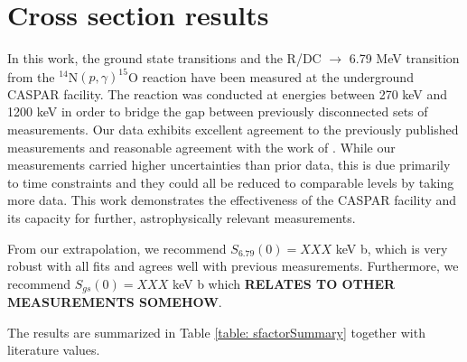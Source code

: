\section{Cross section results}
\label{sec: csResults}

In this work, the ground state transitions and the R/DC $\rightarrow$ 6.79 MeV transition from the $^{14}$N$(p,\gamma)^{15}$O reaction have been measured at the underground CASPAR facility. The reaction was conducted at energies between 270 keV and 1200 keV in order to bridge the gap between previously disconnected sets of measurements. Our data exhibits excellent agreement to the previously published measurements \cite{Formicola2004, Imbriani2005, Runkle2005, Marta2008, Marta2011, Li2016} and reasonable agreement with the work of \cite{Schroder1987, Wagner2018}. While our measurements carried higher uncertainties than prior data, this is due primarily to time constraints and they could all be reduced to comparable levels by taking more data. This work demonstrates the effectiveness of the CASPAR facility and its capacity for further, astrophysically relevant measurements. 

From our extrapolation, we recommend $S_{6.79}(0) = XXX$ keV b, which is very robust with all fits and agrees well with previous measurements. Furthermore, we recommend $S_{gs}(0) = XXX$ keV b which \textbf{RELATES TO OTHER MEASUREMENTS SOMEHOW}. 

The results are summarized in Table \ref{table: sfactorSummary} together with literature values.


